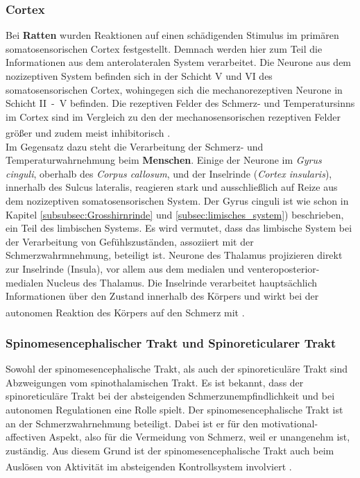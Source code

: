 \subsubsection*{Cortex}
Bei \textbf{Ratten} wurden Reaktionen auf einen schädigenden Stimulus im primären somatosensorischen Cortex festgestellt. Demnach werden hier zum Teil die Informationen aus dem anterolateralen System verarbeitet. Die Neurone aus dem nozizeptiven System befinden sich in der Schicht V und VI des somatosensorischen Cortex, wohingegen sich die mechanorezeptiven Neurone in Schicht II~-~V befinden. Die rezeptiven Felder des Schmerz- und Temperatursinns im Cortex sind im Vergleich zu den der mechanosensorischen rezeptiven Felder größer und zudem meist inhibitorisch \textsuperscript{\cite[Kap.~25]{paxinos2014rat}}.
\\
\noindent Im Gegensatz dazu steht die Verarbeitung der Schmerz- und  Temperaturwahrnehmung beim \textbf{Menschen}. Einige der Neurone im \textit{Gyrus cinguli}, oberhalb des \textit{Corpus callosum}, und der Inselrinde (\textit{Cortex insularis}), innerhalb des Sulcus lateralis, reagieren stark und ausschließlich auf Reize aus dem nozizeptiven somatosensorischen System. Der Gyrus cinguli ist wie schon in Kapitel \ref{subsubsec:Grosshirnrinde} und \ref{subsec:limisches_system}) beschrieben, ein Teil des limbischen Systems. Es wird vermutet, dass das limbische System bei der Verarbeitung von Gefühlszuständen, assoziiert mit der Schmerzwahrmnehmung, beteiligt ist. Neurone des Thalamus projizieren direkt zur Inselrinde (Insula), vor allem aus dem medialen und venteroposterior-medialen Nucleus des Thalamus. Die Inselrinde verarbeitet hauptsächlich Informationen über den Zustand innerhalb des Körpers und wirkt bei der autonomen Reaktion des Körpers auf den Schmerz mit \textsuperscript{\cite[Kap.~24]{kandel2013principles}}.

\subsubsection*{Spinomesencephalischer Trakt und  Spinoreticularer Trakt}

Sowohl der spinomesencephalische Trakt, als auch der spinoreticuläre Trakt sind Abzweigungen vom spinothalamischen Trakt. Es ist bekannt, dass der spinoreticuläre Trakt bei der absteigenden Schmerzunempfindlichkeit und bei autonomen Regulationen eine Rolle spielt. Der spinomesencephalische Trakt ist an der Schmerzwahrnehmung beteiligt. Dabei ist er für den motivational-affectiven Aspekt, also für die Vermeidung von Schmerz, weil er unangenehm ist, zuständig. Aus diesem Grund ist der spinomesencephalische Trakt auch beim Auslösen von Aktivität im absteigenden Kontrollsystem involviert \textsuperscript{\cite[Kap.~24]{kandel2013principles}}.


